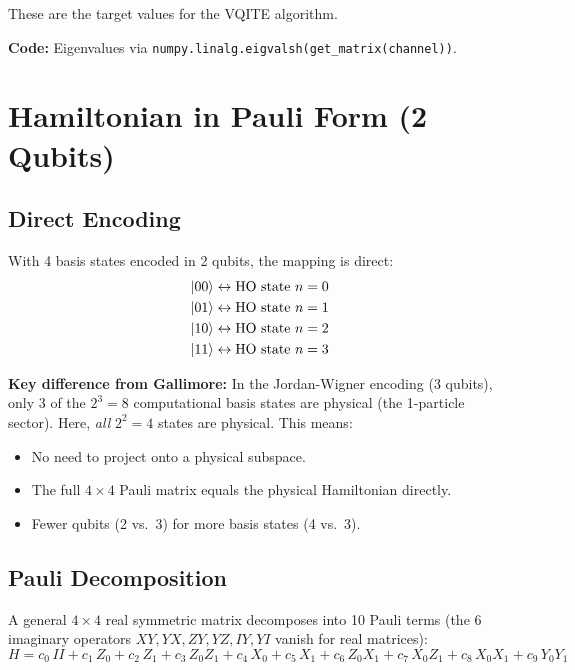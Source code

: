 \documentclass[11pt,a4paper]{article}
\begin{document}
These are the target values for the VQITE algorithm.

\vspace{0.3em}
\noindent\textbf{Code:} Eigenvalues via \texttt{numpy.linalg.eigvalsh(get\_matrix(channel))}.


\section{Hamiltonian in Pauli Form (2 Qubits)}

\subsection{Direct Encoding}

With 4 basis states encoded in 2 qubits, the mapping is direct:
\begin{align}
  \ket{00} &\leftrightarrow \text{HO state } n=0 \nonumber\\
  \ket{01} &\leftrightarrow \text{HO state } n=1 \nonumber\\
  \ket{10} &\leftrightarrow \text{HO state } n=2 \nonumber\\
  \ket{11} &\leftrightarrow \text{HO state } n=3 \nonumber
\end{align}

\textbf{Key difference from Gallimore:} In the Jordan-Wigner encoding (3 qubits), only 3 of the $2^3 = 8$ computational basis states are physical (the 1-particle sector). Here, \emph{all} $2^2 = 4$ states are physical. This means:
\begin{itemize}[nosep]
  \item No need to project onto a physical subspace.
  \item The full $4 \times 4$ Pauli matrix equals the physical Hamiltonian directly.
  \item Fewer qubits (2 vs.\ 3) for more basis states (4 vs.\ 3).
\end{itemize}

\subsection{Pauli Decomposition}

A general $4 \times 4$ real symmetric matrix decomposes into 10 Pauli terms (the 6 imaginary operators $XY, YX, ZY, YZ, IY, YI$ vanish for real matrices):
\begin{equation}
  H = c_0\,II + c_1\,Z_0 + c_2\,Z_1 + c_3\,Z_0 Z_1 + c_4\,X_0 + c_5\,X_1
    + c_6\,Z_0 X_1 + c_7\,X_0 Z_1 + c_8\,X_0 X_1 + c_9\,Y_0 Y_1
  \label{eq:pauli_form}
\end{equation}
\end{document}
